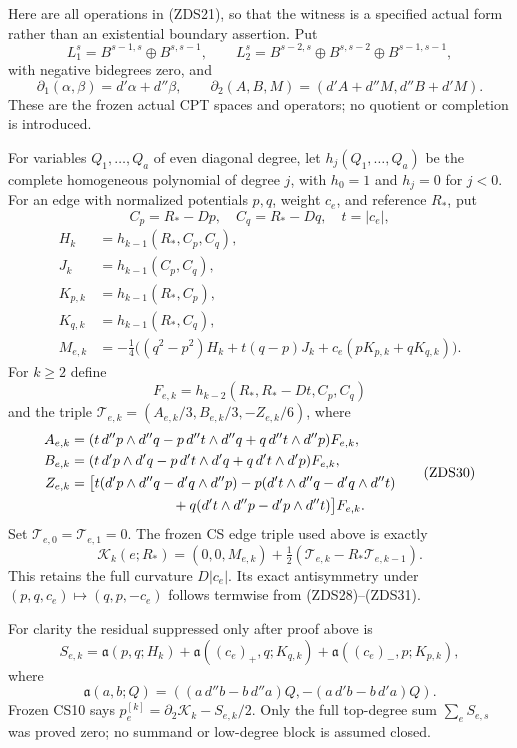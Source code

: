 Here are all operations in (ZDS21), so that the witness is a specified
actual form rather than an existential boundary assertion.  Put
\[
 L_1^s=B^{s-1,s}\oplus B^{s,s-1},\qquad
 L_2^s=B^{s-2,s}\oplus B^{s,s-2}\oplus B^{s-1,s-1},
 \tag{ZDS25}
\]
with negative bidegrees zero, and
\[
 \partial_1(\alpha,\beta)=d'\alpha+d''\beta,\qquad
 \partial_2(A,B,M)=(d'A+d''M,d''B+d'M).
 \tag{ZDS26}
\]
These are the frozen actual CPT spaces and operators; no quotient
or completion is introduced.

For variables $Q_1,\ldots,Q_a$ of even diagonal degree, let
$h_j(Q_1,\ldots,Q_a)$ be the complete homogeneous polynomial of
degree $j$, with $h_0=1$ and $h_j=0$ for $j<0$.  For an edge with
normalized potentials $p,q$, weight $c_e$, and reference $R_*$, put
\[
 C_p=R_*-Dp,\quad C_q=R_*-Dq,\quad t=|c_e|,
 \tag{ZDS27}
\]
\[
 \begin{split}
 H_k&=h_{k-1}(R_*,C_p,C_q),\\
 J_k&=h_{k-1}(C_p,C_q),\\
 K_{p,k}&=h_{k-1}(R_*,C_p),\\
 K_{q,k}&=h_{k-1}(R_*,C_q),\\
 M_{e,k}&=-\tfrac14\bigl((q^2-p^2)H_k+t(q-p)J_k
                      +c_e(pK_{p,k}+qK_{q,k})\bigr).
 \end{split}
 \tag{ZDS28}
\]
For $k\ge2$ define
\[
 F_{e,k}=h_{k-2}(R_*,R_*-Dt,C_p,C_q)
 \tag{ZDS29}
\]
and the triple $\mathcal T_{e,k}=(A_{e,k}/3,B_{e,k}/3,-Z_{e,k}/6)$,
where
\[
\begin{split}
A_{e,k}={}&(t\,d''p\wedge d''q-p\,d''t\wedge d''q
                         +q\,d''t\wedge d''p)F_{e,k},\\
B_{e,k}={}&(t\,d'p\wedge d'q-p\,d't\wedge d'q
                         +q\,d't\wedge d'p)F_{e,k},\\
Z_{e,k}={}&\bigl[t(d'p\wedge d''q-d'q\wedge d''p)
 -p(d't\wedge d''q-d'q\wedge d''t)\\
&\hspace{21mm}+q(d't\wedge d''p-d'p\wedge d''t)\bigr]F_{e,k}.
\end{split}
\tag{ZDS30}
\]
Set $\mathcal T_{e,0}=\mathcal T_{e,1}=0$.  The frozen CS edge
triple used above is exactly
\[
 \mathcal K_k(e;R_*)=(0,0,M_{e,k})
          +\tfrac12(\mathcal T_{e,k}-R_*\mathcal T_{e,k-1}).
 \tag{ZDS31}
\]
This retains the full curvature $D|c_e|$.  Its exact antisymmetry
under $(p,q,c_e)\mapsto(q,p,-c_e)$ follows termwise from
(ZDS28)--(ZDS31).

For clarity the residual suppressed only after proof above is
\[
 S_{e,k}=\mathfrak a(p,q;H_k)
       +\mathfrak a((c_e)_+,q;K_{q,k})
       +\mathfrak a((c_e)_-,p;K_{p,k}),
 \tag{ZDS32}
\]
where
\[
 \mathfrak a(a,b;Q)=
 ((a\,d''b-b\,d''a)Q,-(a\,d'b-b\,d'a)Q).
 \tag{ZDS33}
\]
Frozen CS10 says $p_e^{[k]}=\partial_2\mathcal K_k-S_{e,k}/2$.
Only the full top-degree sum $\sum_eS_{e,s}$ was proved zero;
no summand or low-degree block is assumed closed.

